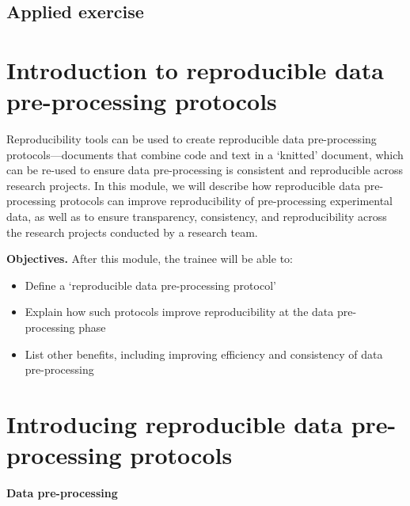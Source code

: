 \documentclass[]{tufte-book}
\providecommand{\tightlist}{%
  \setlength{\itemsep}{0pt}\setlength{\parskip}{0pt}}
\begin{document}
\hypertarget{applied-exercise-6}{%
\subsection{Applied exercise}\label{applied-exercise-6}}

\hypertarget{introduction-to-reproducible-data-pre-processing-protocols}{%
\section{Introduction to reproducible data pre-processing protocols}\label{introduction-to-reproducible-data-pre-processing-protocols}}

Reproducibility tools can be used to create reproducible data pre-processing
protocols---documents that combine code and text in a `knitted' document, which
can be re-used to ensure data pre-processing is consistent and reproducible
across research projects. In this module, we will describe how reproducible data
pre-processing protocols can improve reproducibility of pre-processing
experimental data, as well as to ensure transparency, consistency, and
reproducibility across the research projects conducted by a research team.

\textbf{Objectives.} After this module, the trainee will be able to:

\begin{itemize}
\tightlist
\item
  Define a `reproducible data pre-processing protocol'
\item
  Explain how such protocols improve reproducibility at the data pre-processing
  phase
\item
  List other benefits, including improving efficiency and consistency of data
  pre-processing
\end{itemize}

\hypertarget{introducing-reproducible-data-pre-processing-protocols}{%
\section{Introducing reproducible data pre-processing protocols}\label{introducing-reproducible-data-pre-processing-protocols}}

\textbf{Data pre-processing}
\end{document}
